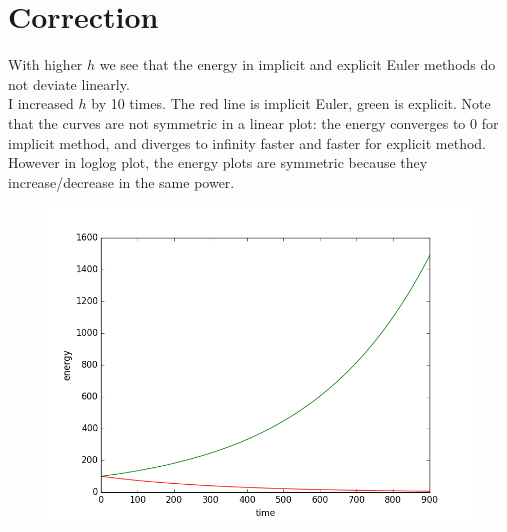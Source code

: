 \documentclass[10pt]{article}
\begin{document}
\section{Correction}
With higher $h$ we see that the energy in implicit and explicit Euler methods do not deviate linearly.\\
I increased $h$ by 10 times. The red line is implicit Euler, green is explicit. Note that the curves are not symmetric in a linear plot: the energy converges to 0 for implicit method, and diverges to infinity faster and faster for explicit method. However in loglog plot, the energy plots are symmetric because they increase/decrease in the same power.\\

\begin{figure}[!h]
\centering
\includegraphics[scale=0.5]{w3fig15.png}
\end{figure}
\end{document}
